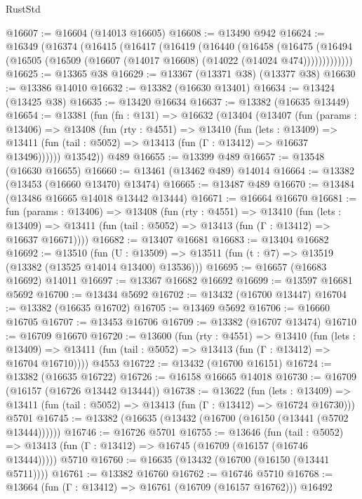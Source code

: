 \begin{lexlean}{RustStd}
\begin{coremodule}
@16607 := @16604 (@14013 @16605)
@16608 := @13490 @942
@16624 := @16349
    (@16374
      (@16415
        (@16417
          (@16419
            (@16440
              (@16458
                (@16475
                  (@16494 (@16505 (@16509 (@16607 (@14017 @16608) (@14022 (@14024 @474)))))))))))))
@16625 := @13365 @38
@16629 := @13367 (@13371 @38) (@13377 @38)
@16630 := @13386 @14010
@16632 := @13382 (@16630 @13401)
@16634 := @13424 (@13425 @38)
@16635 := @13420 @16634
@16637 := @13382 (@16635 @13449)
@16654 := @13381
    (fun (fn : @131) =>
    @16632
      (@13404
        (@13407
          (fun (params : @13406) =>
          @13408
            (fun (rty : @4551) =>
            @13410
              (fun (lets : @13409) =>
              @13411 (fun (tail : @5052) => @13413 (fun (Γ : @13412) => @16637 @13496))))))
        @13542))
    @489
@16655 := @13399 @489
@16657 := @13548 (@16630 @16655)
@16660 := @13461 (@13462 @489) @14014
@16664 := @13382 (@13453 (@16660 @13470) @13474)
@16665 := @13487 @489
@16670 := @13484 (@13486 @16665 @14018 @13442 @13444)
@16671 := @16664 @16670
@16681 := fun (params : @13406) =>
  @13408
    (fun (rty : @4551) =>
    @13410
      (fun (lets : @13409) =>
      @13411 (fun (tail : @5052) => @13413 (fun (Γ : @13412) => @16637 @16671))))
@16682 := @13407 @16681
@16683 := @13404 @16682
@16692 := @13510
    (fun (U : @13509) => @13511 (fun (t : @7) => @13519 (@13382 (@13525 @14014 @13400) @13536)))
@16695 := @16657 (@16683 @16692) @14011
@16697 := @13367 @16682 @16692
@16699 := @13597 @16681 @5692
@16700 := @13434 @5692
@16702 := @13432 (@16700 @13447)
@16704 := @13382 (@16635 @16702)
@16705 := @13469 @5692
@16706 := @16660 @16705
@16707 := @13453 @16706
@16709 := @13382 (@16707 @13474)
@16710 := @16709 @16670
@16720 := @13600
    (fun (rty : @4551) =>
    @13410
      (fun (lets : @13409) =>
      @13411 (fun (tail : @5052) => @13413 (fun (Γ : @13412) => @16704 @16710))))
    @4553
@16722 := @13432 (@16700 @16151)
@16724 := @13382 (@16635 @16722)
@16726 := @16158 @16665 @14018
@16730 := @16709 (@16157 (@16726 @13442 @13444))
@16738 := @13622
    (fun (lets : @13409) =>
    @13411 (fun (tail : @5052) => @13413 (fun (Γ : @13412) => @16724 @16730)))
    @5701
@16745 := @13382 (@16635 (@13432 (@16700 (@16150 (@13441 (@5702 @13444))))))
@16746 := @16726 @5701
@16755 := @13646
    (fun (tail : @5052) => @13413 (fun (Γ : @13412) => @16745 (@16709 (@16157 (@16746 @13444)))))
    @5710
@16760 := @16635 (@13432 (@16700 (@16150 (@13441 @5711))))
@16761 := @13382 @16760
@16762 := @16746 @5710
@16768 := @13664 (fun (Γ : @13412) => @16761 (@16709 (@16157 @16762))) @16492

\end{coremodule}
\end{lexlean}
